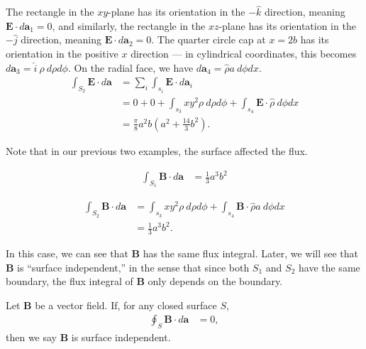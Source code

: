 \documentclass[10pt]{mypackage}
\begin{document}
\begin{example}
\begin{example}
    The rectangle in the $xy$-plane has its orientation in the $-\hat{k}$ direction, meaning $\mathbf{E}\cdot d\mathbf{a}_1 = 0$, and similarly, the rectangle in the $xz$-plane has its orientation in the $-\hat{j}$ direction, meaning $\mathbf{E}\cdot d\mathbf{a}_2 = 0$. The quarter circle cap at $x=2b$ has its orientation in the positive $x$ direction --- in cylindrical coordinates, this becomes $d\mathbf{a}_3 = \hat{i}\:\rho\:d\rho d\phi$. On the radial face, we have $d\mathbf{a}_4 = \hat{\rho} a\:d\phi dx$.
    \begin{align*}
      \int_{S_2}^{} \mathbf{E}\cdot d\mathbf{a} &= \sum_{i}\int_{s_i}^{} \mathbf{E}\cdot d\mathbf{a}_i\\
                                                &= 0 + 0 + \int_{s_3}^{} xy^2\rho\:d\rho d\phi + \int_{s_4}^{} \mathbf{E}\cdot \hat{\rho}\:d\phi dx\\
                                                &= \frac{\pi}{8}a^2 b\left(a^2 + \frac{14}{3}b^2\right).
    \end{align*}
  \end{example}
  Note that in our previous two examples, the surface affected the flux.
  \begin{example}
    \begin{align*}
      \int_{S_1}^{} \mathbf{B}\cdot d\mathbf{a} &= \frac{1}{3}a^3b^2
    \end{align*}
  \end{example}
  \begin{example}
    \begin{align*}
      \int_{S_2}^{} \mathbf{B}\cdot d\mathbf{a} &= \int_{s_3}^{} xy^2\rho\:d\rho d\phi + \int_{s_4}^{} \mathbf{B}\cdot \hat{\rho} a\:d\phi dx\\
                                                &= \frac{1}{3}a^3b^2.
    \end{align*}
  \end{example}
  In this case, we can see that $\mathbf{B}$ has the same flux integral. Later, we will see that $\mathbf{B}$ is ``surface independent,'' in the sense that since both $S_1$ and $S_2$ have the same boundary, the flux integral of $\mathbf{B}$ only depends on the boundary.
\end{example}
\begin{definition}
  Let $\mathbf{B}$ be a vector field. If, for any closed surface $S$,
  \begin{align*}
    \oint_{S}\mathbf{B}\cdot d\mathbf{a} &= 0,
  \end{align*}
  then we say $\mathbf{B}$ is surface independent.
\end{definition}
\end{document}
